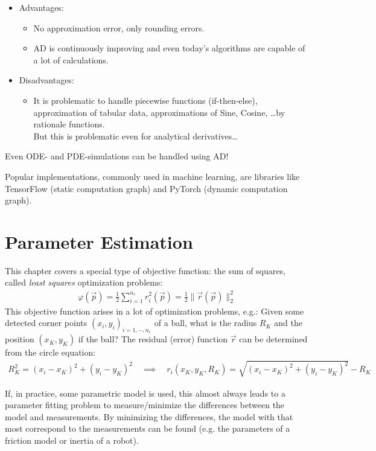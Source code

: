 		\begin{itemize}
			\item Advantages:
				\begin{itemize}
					\item No approximation error, only rounding errors.
					\item AD is continuously improving and even today's algorithms are capable of a lot of calculations.
				\end{itemize}
			\item Disadvantages:
				\begin{itemize}
					\item It is problematic to handle piecewise functions (if-then-else), approximation of tabular data, approximations of Sine, Cosine, \dots by rationale functions. \\ But this is problematic even for analytical derivatives\dots
				\end{itemize}
		\end{itemize}
		Even ODE- and PDE-simulations can be handled using AD!

		Popular implementations, commonly used in machine learning, are libraries like TensorFlow (static computation graph) and PyTorch (dynamic computation graph).

\chapter{Parameter Estimation}
	\label{c:leastSquares}

	This chapter covers a special type of objective function: the sum of squares, called \emph{least squares} optimization problems:
	\begin{align*}
		\varphi(\vec{p}) = \frac{1}{2} \sum_{i = 1}^{n_r} r_i^2(\vec{p}) = \frac{1}{2} \lVert \vec{r}(\vec{p}) \rVert_2^2
	\end{align*}
	This objective function arises in a lot of optimization problems, e.g.: Given some detected corner points \( (x_i, y_i)_{i = 1, \cdots, n_r} \) of a ball, what is the radius \(R_K\) and the position \( (x_K, y_K) \) if the ball? The residual (error) function \(\vec{r}\) can be determined from the circle equation:
	\begin{align*}
		R_K^2 = (x_i - x_K)^2 + (y_i - y_K)^2 \quad\implies\quad r_i(x_K, y_K, R_K) = \sqrt{(x_i - x_K)^2 + (y_i - y_K)^2} - R_K
	\end{align*}

	If, in practice, some parametric model is used, this almost always leads to a parameter fitting problem to measure/minimize the differences between the model and measurements. By minimizing the differences, the model with that most correspond to the measurements can be found (e.g. the parameters of a friction model or inertia of a robot).

